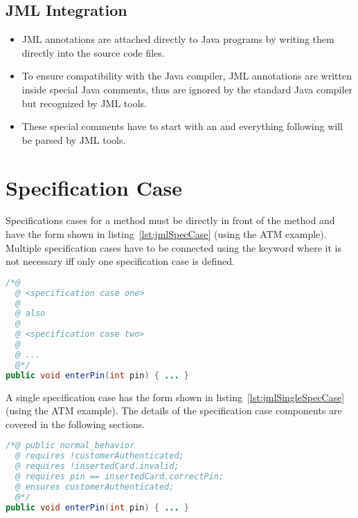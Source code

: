 		\subsection{JML Integration}
			\begin{itemize}
				\item JML annotations are attached directly to Java programs by writing them directly into the source code files.
				\item To ensure compatibility with the Java compiler, JML annotations are written inside special Java comments, thus are ignored by the standard Java compiler but recognized by JML tools.
				\item These special comments have to start with an \texttt{\@} and everything following will be parsed by JML tools.
			\end{itemize}
		

	\section{Specification Case}
		Specifications cases for a method must be directly in front of the method and have the form shown in listing~\ref{lst:jmlSpecCase} (using the ATM example). Multiple specification cases have to be connected using the keyword  where it is not necessary iff only one specification case is defined.
		
		\begin{lstlisting}[caption = { Specification Cases in JML }, label = lst:jmlSpecCase, language = Java]
/*@
  @ <specification case one>
  @
  @ also
  @
  @ <specification case two>
  @
  @ ...
  @*/
public void enterPin(int pin) { ... }
		\end{lstlisting}
		
		A single specification case has the form shown in listing~\ref{lst:jmlSingleSpecCase} (using the ATM example). The details of the specification case components are covered in the following sections.
		
		\begin{lstlisting}[caption = { Single Specification Case in JML }, label = lst:jmlSingleSpecCase, language = Java]
/*@ public normal_behavior
  @ requires !customerAuthenticated;
  @ requires !insertedCard.invalid;
  @ requires pin == insertedCard.correctPin;
  @ ensures customerAuthenticated;
  @*/
public void enterPin(int pin) { ... }
		\end{lstlisting}

